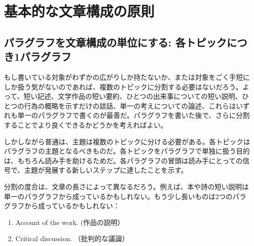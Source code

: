 \chapter{基本的な文章構成の原則}
\section{パラグラフを文章構成の単位にする: 各トピックにつき1パラグラフ}
もし書いている対象がわずかの広がりしか持たないか、または対象をごく手短にしか扱う気がないのであれば、複数のトピックに分割する必要はないだろう。よって、短い記述、文学作品の短い要約、ひとつの出来事についての短い説明、ひとつの行為の概略を示すだけの談話、単一の考えについての論述、これらはいずれも単一のパラグラフで書くのが最善だ。パラグラフを書いた後で、さらに分割することでより良くできるかどうかを考えればよい。
\par
しかしながら普通は、主題は複数のトピックに分ける必要がある。各トピックはパラグラフの主題となるべきものだ。各トピックをパラグラフで単独に扱う目的は、もちろん読み手を助けるためだ。各パラグラフの冒頭は読み手にとっての信号で、主題が発展する新しいステップに達したことを示す。
\par
分割の度合は、文章の長さによって異なるだろう。例えば、本や詩の短い説明は単一のパラグラフから成っているかもしれない。もう少し長いものは2つのパラグラフから成っているかもしれない：
\begin{enumerate}[label=\Alph*.]
    \item Account of the work. (作品の説明）
    \item Critical discussion. （批判的な議論）  
\end{enumerate}

